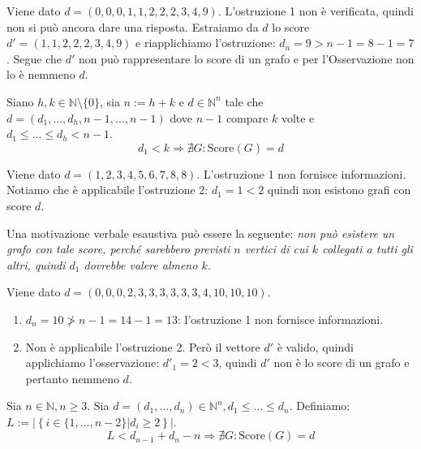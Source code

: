 \documentclass[oneside]{book}
\theoremstyle{remark}
\begin{document}
\begin{tcolorbox}[colback=blue!30, colframe=blue!30!black, title=Esempio]
Viene dato $d=(0,0,0,1,1,2,2,2,3,4,9)$. L'ostruzione
1 non è verificata, quindi non si può ancora dare una risposta.
Estraiamo da $d$ lo score $d'=(1,1,2,2,2,3,4,9)$ e riapplichiamo
l'ostruzione: $d_n=9>n-1=8-1=7$. Segue che $d'$ non può rappresentare
lo score di un grafo e per l'Osservazione non lo è nemmeno $d$.
\end{tcolorbox}


\begin{tcolorbox}[colback=red!30, colframe=red!30!black, title=Ostruzione 2]
Siano $h,k\in\mathbb{N}\setminus\{0\}$, sia $n:=h+k$ e $d\in\mathbb{N}^n$
tale che $d=(d_1,...,d_h,n-1,...,n-1)$ dove $n-1$ compare $k$ volte
e $d_1\leq...\leq d_h < n-1$.
\[ d_1<k \Longrightarrow \nexists G:\text{Score}(G)=d \]
\end{tcolorbox}
\begin{tcolorbox}[colback=blue!30, colframe=blue!30!black, title=Esempio]
Viene dato $d=(1,2,3,4,5,6,7,8,8)$. L'ostruzione 1
non fornisce informazioni. Notiamo che è applicabile l'ostruzione 2:
$d_1=1<2$ quindi non esistono grafi con score $d$.
\end{tcolorbox}

\noindent Una motivazione verbale esaustiva può essere la seguente:
\emph{non può esistere un grafo con tale score,
perché sarebbero previsti $n$ vertici di cui $k$ collegati a
tutti gli altri, quindi $d_1$ dovrebbe valere almeno $k$.}

\begin{tcolorbox}[colback=blue!30, colframe=blue!30!black, title=Esempio: combinare l'osservazione alle altre ostruzioni]
Viene dato $d=(0,0,0,2,3,3,3,3,3,3,4,10,10,10)$.
\begin{enumerate}
\item $d_n=10 \not> n-1=14-1=13$: l'ostruzione 1 non fornisce
informazioni.

\item Non è applicabile l'ostruzione 2. Però il vettore $d'$
è valido, quindi applichiamo l'osservazione: $d'_1=2<3$, quindi
$d'$ non è lo score di un grafo e pertanto nemmeno $d$.
\end{enumerate}
\end{tcolorbox}  




\begin{tcolorbox}[colback=red!30, colframe=red!30!black, title=Ostruzione 3]
Sia $n\in\mathbb{N},n\geq3$. Sia $d=(d_1,...,d_n)\in\mathbb{N}^n,
d_1\leq...\leq d_n$. Definiamo: $L:=\left|\left\{ i\in\{1,...,n-2\}|d_i\geq2 \right\}\right|$.
\[ L < d_{n-1}+d_n-n \Longrightarrow \nexists G:\text{Score}(G)=d \]
\end{tcolorbox}
\end{document}
